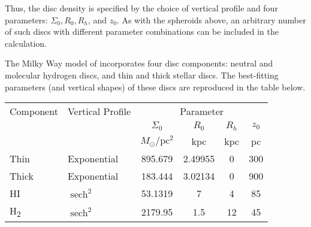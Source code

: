 \documentclass[11pt,a4paper]{article}
\DeclareMathOperator{\sech}{sech}
\begin{document}
Thus, the disc density is specified by the choice of vertical profile and four parameters: $\Sigma_0, R_0, R_h$, and $z_0$. As with the spheroids above, an arbitrary number of such discs with different parameter combinations can be included in the calculation.

The Milky Way model of \citet{McMillan2017} incorporates four disc components: neutral and molecular hydrogen discs, and thin and thick stellar discs. The best-fitting parameters (and vertical shapes) of these discs are reproduced in the table below.

\begin{center}
    \begin{tabular}{l l c c c c}\toprule[1.5pt]
    Component          & Vertical Profile & \multicolumn{4}{c}{Parameter} \\
                       &                  & $\Sigma_0$              & $R_0$   & $R_h$ & $z_0$ \\
                       &                  & $M_\odot/\mathrm{pc}^2$ & kpc     & kpc   & pc    \\ \midrule[0.5pt]
    Thin               & Exponential      & 895.679                 & 2.49955 & 0     & 300   \\
    Thick              & Exponential      & 183.444                 & 3.02134 & 0     & 900   \\
    HI                 & $\sech^2$        & 53.1319                 & 7       & 4     & 85    \\
    H\textsubscript{2} & $\sech^2$        & 2179.95                 & 1.5     & 12    & 45    \\ \bottomrule[1.5pt]
    \end{tabular}
\end{center}




\end{document}
